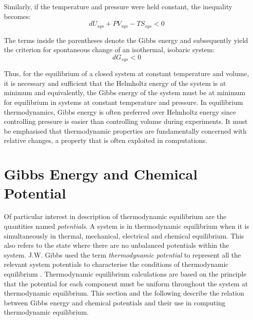 		Similarly, if the temperature and pressure were held constant, the inequality becomes:
		\begin{equation}
			d{U_{sys} + PV_{sys} - TS_{sys} } < 0
		\end{equation}

		The terms inside the parentheses denote the Gibbs energy and subsequently yield the criterion for spontaneous change of an isothermal, isobaric system:
		\begin{equation}
			d{G_{sys} } < 0
		\end{equation}

		Thus, for the equilibrium of a closed system at constant temperature and volume, it is necessary and sufficient that the Helmholtz energy of the system is at minimum and equivalently, the Gibbs energy of the system must be at minimum for equilibrium in systems at constant temperature and pressure. In equilibrium thermodynamics, Gibbs energy is often preferred over Helmholtz energy since controlling pressure is easier than controlling volume during experiments. It must be emphasised that thermodynamic properties are fundamentally concerned with relative changes, a property that is often exploited in computations.

\section{Gibbs Energy and Chemical Potential}
	Of particular interest in description of  thermodynamic equilibrium are the quantities named \emph{potentials}. A system is in thermodynamic equilibrium when it is simultaneously in thermal, mechanical, electrical and chemical equilibrium. This also refers to the state where there are no unbalanced potentials within the system. J.W. Gibbs used the term \emph{thermodynamic potential} to represent all the relevant system potentials to characterise the conditions of thermodynamic equilibrium \cite{Gibbs:1878aa}. Thermodynamic equilibrium calculations are based on the principle that the potential for each component must be uniform throughout the system at thermodynamic equilibrium. This section and the following describe the relation between Gibbs energy and chemical potentials and their use in computing thermodynamic equilibrium.

